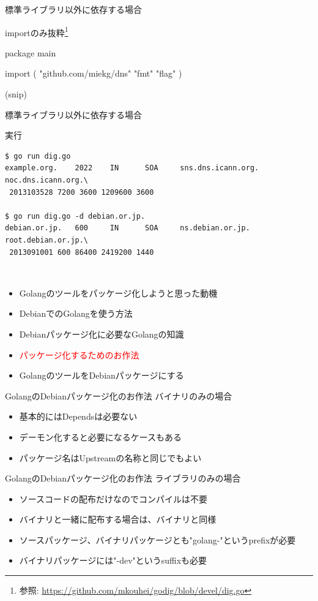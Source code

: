 \begin{frame}[containsverbatim]{標準ライブラリ以外に依存する場合}

importのみ抜粋\footnote{参照: \url{https://github.com/mkouhei/godig/blob/devel/dig.go}}
\begin{commandline}
package main

import (
"github.com/miekg/dns"
"fmt"
"flag"
)

(snip)
\end{commandline}
\end{frame}

\begin{frame}[containsverbatim]{標準ライブラリ以外に依存する場合}

実行
{\tiny
{\begin{lstlisting}
$ go run dig.go
example.org.    2022    IN      SOA     sns.dns.icann.org. noc.dns.icann.org.\
 2013103528 7200 3600 1209600 3600

$ go run dig.go -d debian.or.jp.
debian.or.jp.   600     IN      SOA     ns.debian.or.jp. root.debian.or.jp.\
 2013091001 600 86400 2419200 1440
\end{lstlisting}}}
\end{frame}

\begin{frame}{　}
\begin{itemize}
  \item Golangのツールをパッケージ化しようと思った動機
  \item DebianでのGolangを使う方法
  \item Debianパッケージ化に必要なGolangの知識
  \item \textcolor{red}{パッケージ化するためのお作法}
  \item GolangのツールをDebianパッケージにする
\end{itemize}
\end{frame}

\begin{frame}{GolangのDebianパッケージ化のお作法}
  バイナリのみの場合
  \begin{itemize}
  \item 基本的にはDependsは必要ない
  \item デーモン化すると必要になるケースもある
  \item パッケージ名はUpstreamの名称と同じでもよい
  \end{itemize}
\end{frame}

\begin{frame}{GolangのDebianパッケージ化のお作法}
  ライブラリのみの場合
  \begin{itemize}
  \item ソースコードの配布だけなのでコンパイルは不要
  \item バイナリと一緒に配布する場合は、バイナリと同様
  \item ソースパッケージ、バイナリパッケージとも"golang-"というprefixが必要
  \item バイナリパッケージには"-dev"というsuffixも必要
  \end{itemize}
\end{frame}

